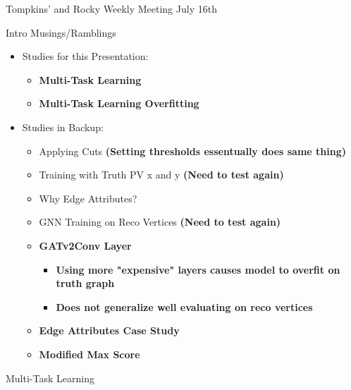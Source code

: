 \documentclass[xcolor=table,aspectratio=169]{beamer}
\begin{document}
\begin{frame}[plain]
    \centering
    Tompkins' and Rocky Weekly Meeting July 16th
\end{frame}

\begin{frame}{Intro Musings/Ramblings}
    \centering
    \begin{itemize}
        \item Studies for this Presentation:
        \begin{itemize}
            \item \textbf{Multi-Task Learning}
            \item \textbf{Multi-Task Learning Overfitting}
        \end{itemize}
        \item Studies in Backup:
        \begin{itemize}
            \item Applying Cuts \textbf{(Setting thresholds essentually does same thing)}
            \item Training with Truth PV x and y \textbf{(Need to test again)}
            \item Why Edge Attributes?
            \item GNN Training on Reco Vertices \textbf{(Need to test again)}
            \item \textbf{GATv2Conv Layer}
            \begin{itemize}
                \item \textbf{Using more "expensive" layers causes model to overfit on truth graph}
                \item \textbf{Does not generalize well evaluating on reco vertices}
            \end{itemize}
            \item \textbf{Edge Attributes Case Study}
            \item \textbf{Modified Max Score}
        \end{itemize}
    \end{itemize}
\end{frame}

\begin{frame}[plain]
    \centering
    Multi-Task Learning
\end{frame}
\end{document}
